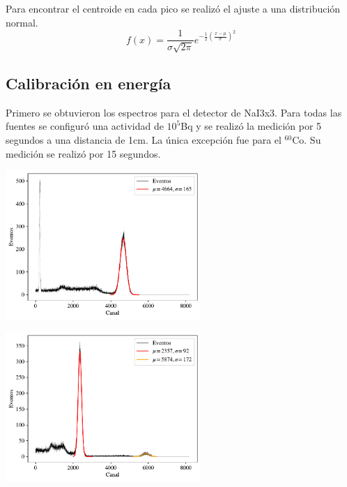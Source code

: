 \documentclass[a4paper, onecolumn]{article}
\begin{document}
		Para encontrar el centroide en cada pico se realizó el ajuste a una distribución normal.
		$$
		f(x)=\frac{1}{\sigma \sqrt{2 \pi}} e^{-\frac{1}{2}\left(\frac{x-\mu}{\sigma}\right)^2}
		$$

		\subsection{Calibración en energía}
		Primero se obtuvieron los espectros para el detector de NaI3x3. Para todas las fuentes se configuró una actividad de $10^5$Bq y se realizó la medición por 5 segundos a una distancia de 1cm. La única excepción fue para el ${}^{60}\mathrm{Co}$. Su medición se realizó por 15 segundos.

		\begin{center}
			\includegraphics[width=210pt]{img/nai_33_cs_137.pdf}
		\end{center}

		\begin{center}
			\includegraphics[width=210pt]{img/nai_33_na_22.pdf}
		\end{center}
\end{document}
